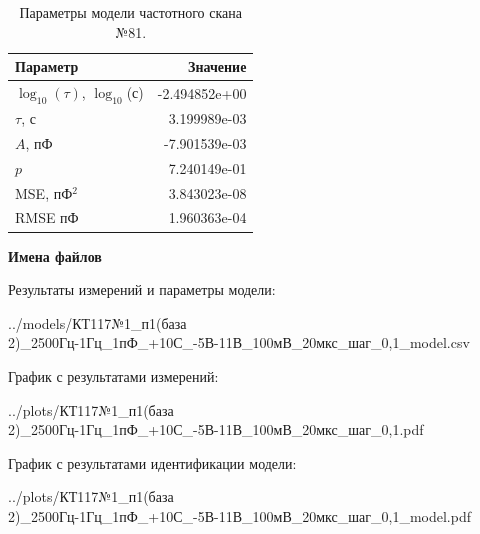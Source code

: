 \begin{table}[!ht]
    \centering
    \caption{Параметры модели частотного скана №81.}
    \begin{tabular}{|l|r|}
        \hline
        Параметр                                       & Значение                  \\ \hline
        $\log_{10}(\tau)$, $\log_{10}$(с)              & -2.494852e+00             \\ \hline
        $\tau$, с                                      & 3.199989e-03              \\ \hline
        $A$, пФ                                        & -7.901539e-03             \\ \hline
        $p$                                            & 7.240149e-01              \\ \hline
        MSE, пФ$^2$                                    & 3.843023e-08              \\ \hline
        RMSE пФ                                        & 1.960363e-04              \\ \hline
    \end{tabular}
    \label{table:frequency_scan_model_81}
\end{table}

\textbf{Имена файлов}

Результаты измерений и параметры модели:

\scriptsize../models/КТ117№1\_п1(база 2)\_2500Гц-1Гц\_1пФ\_+10С\_-5В-11В\_100мВ\_20мкс\_шаг\_0,1\_model.csv
\normalsize

График с результатами измерений:

\scriptsize../plots/КТ117№1\_п1(база 2)\_2500Гц-1Гц\_1пФ\_+10С\_-5В-11В\_100мВ\_20мкс\_шаг\_0,1.pdf
\normalsize

График с результатами идентификации модели:

\scriptsize../plots/КТ117№1\_п1(база 2)\_2500Гц-1Гц\_1пФ\_+10С\_-5В-11В\_100мВ\_20мкс\_шаг\_0,1\_model.pdf
\normalsize

